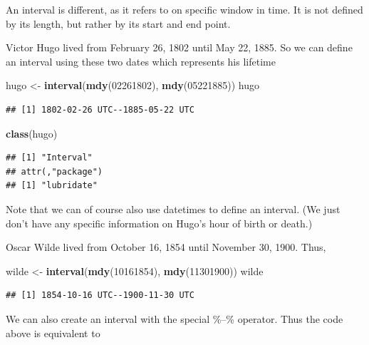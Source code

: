 \documentclass[]{tufte-book}
\newenvironment{Shaded}{}{}
\newcommand{\DecValTok}[1]{\textcolor[rgb]{0.25,0.63,0.44}{#1}}
\newcommand{\KeywordTok}[1]{\textcolor[rgb]{0.00,0.44,0.13}{\textbf{#1}}}
\newcommand{\NormalTok}[1]{#1}
\newcommand{\StringTok}[1]{\textcolor[rgb]{0.25,0.44,0.63}{#1}}
\begin{document}
An interval is different, as it refers to on specific window in time. It is not defined by its length, but rather by its start and end point.

Victor Hugo lived from February 26, 1802 until May 22, 1885. So we can define an interval using these two dates which represents his lifetime

\begin{Shaded}
\begin{Highlighting}[]
\NormalTok{hugo <-}\StringTok{ }\KeywordTok{interval}\NormalTok{(}\KeywordTok{mdy}\NormalTok{(}\DecValTok{02261802}\NormalTok{), }\KeywordTok{mdy}\NormalTok{(}\DecValTok{05221885}\NormalTok{))}
\NormalTok{hugo}
\end{Highlighting}
\end{Shaded}

\begin{verbatim}
## [1] 1802-02-26 UTC--1885-05-22 UTC
\end{verbatim}

\begin{Shaded}
\begin{Highlighting}[]
\KeywordTok{class}\NormalTok{(hugo)}
\end{Highlighting}
\end{Shaded}

\begin{verbatim}
## [1] "Interval"
## attr(,"package")
## [1] "lubridate"
\end{verbatim}

Note that we can of course also use datetimes to define an interval. (We just don't have any specific information on Hugo's hour of birth or death.)

Oscar Wilde lived from October 16, 1854 until November 30, 1900. Thus,

\begin{Shaded}
\begin{Highlighting}[]
\NormalTok{wilde <-}\StringTok{ }\KeywordTok{interval}\NormalTok{(}\KeywordTok{mdy}\NormalTok{(}\DecValTok{10161854}\NormalTok{), }\KeywordTok{mdy}\NormalTok{(}\DecValTok{11301900}\NormalTok{))}
\NormalTok{wilde}
\end{Highlighting}
\end{Shaded}

\begin{verbatim}
## [1] 1854-10-16 UTC--1900-11-30 UTC
\end{verbatim}

We can also create an interval with the special \%--\% operator. Thus the code above is equivalent to
\end{document}
